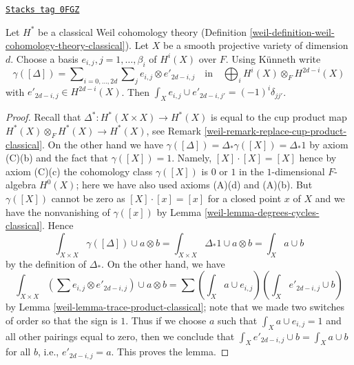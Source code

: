\begin{lemma}
\label{weil-lemma-class-diagonal-classical}
\href{https://stacks.math.columbia.edu/tag/0FGZ}{\texttt{Stacks tag 0FGZ}}

Let $H^*$ be a classical Weil cohomology theory
(Definition \ref{weil-definition-weil-cohomology-theory-classical}).
Let $X$ be a smooth projective variety of dimension $d$.
Choose a basis $e_{i, j}, j = 1, \ldots, \beta_i$ of $H^i(X)$ over $F$.
Using K\"unneth write
$$
\gamma([\Delta]) =
\sum\nolimits_{i = 0, \ldots, 2d}
\sum\nolimits_j e_{i, j} \otimes e'_{2d - i , j}
\quad\text{in}\quad
\bigoplus\nolimits_i H^i(X) \otimes_F H^{2d - i}(X)
$$
with $e'_{2d - i, j} \in H^{2d - i}(X)$.
Then $\int_X e_{i, j} \cup e'_{2d - i, j'} = (-1)^i\delta_{jj'}$.
\end{lemma}

\begin{proof}

Recall that $\Delta^* : H^*(X \times X) \to H^*(X)$ is equal to the
cup product map $H^*(X) \otimes_F H^*(X) \to H^*(X)$, see
Remark \ref{weil-remark-replace-cup-product-classical}. On the other hand we have
$\gamma([\Delta]) = \Delta_*\gamma([X]) = \Delta_*1$ by
axiom (C)(b) and the fact that $\gamma([X]) = 1$. Namely,
$[X] \cdot [X] = [X]$ hence by axiom (C)(c) the cohomology class
$\gamma([X])$ is $0$ or $1$ in the $1$-dimensional $F$-algebra $H^0(X)$;
here we have also used axioms (A)(d) and (A)(b).
But $\gamma([X])$ cannot be zero as $[X] \cdot [x] = [x]$
for a closed point $x$ of $X$ and we have the nonvanishing
of $\gamma([x])$ by Lemma \ref{weil-lemma-degrees-cycles-classical}.
Hence
$$
\int_{X \times X} \gamma([\Delta]) \cup a \otimes b =
\int_{X \times X} \Delta_*1 \cup a \otimes b =
\int_X a \cup b
$$
by the definition of $\Delta_*$. On the other hand, we have
$$
\int_{X \times X} (\sum e_{i, j} \otimes e'_{2d -i , j}) \cup a \otimes b =
\sum (\int_X a \cup e_{i, j})(\int_X e'_{2d - i, j} \cup b)
$$
by Lemma \ref{weil-lemma-trace-product-classical}; note that we made
two switches of order so that the sign is $1$.
Thus if we choose $a$ such that $\int_X a \cup e_{i, j} = 1$
and all other pairings equal to zero, then we conclude that
$\int_X e'_{2d - i, j} \cup b = \int_X a \cup b$ for all $b$, i.e.,
$e'_{2d - i, j} = a$. This proves the lemma.
\end{proof}

